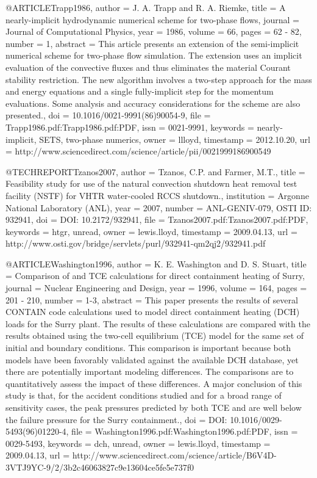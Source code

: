 {{@ARTICLE{Trapp1986,
  author = {J. A. Trapp and R. A. Riemke},
  title = {A nearly-implicit hydrodynamic numerical scheme for two-phase flows},
  journal = {Journal of Computational Physics},
  year = {1986},
  volume = {66},
  pages = {62 - 82},
  number = {1},
  abstract = {This article presents an extension of the semi-implicit numerical
	scheme for two-phase flow simulation. The extension uses an implicit
	evaluation of the convective fluxes and thus eliminates the material
	Courant stability restriction. The new algorithm involves a two-step
	approach for the mass and energy equations and a single fully-implicit
	step for the momentum evaluations. Some analysis and accuracy considerations
	for the scheme are also presented.},
  doi = {10.1016/0021-9991(86)90054-9},
  file = {Trapp1986.pdf:Trapp1986.pdf:PDF},
  issn = {0021-9991},
  keywords = {nearly-implicit, SETS, two-phase numerics},
  owner = {llloyd},
  timestamp = {2012.10.20},
  url = {http://www.sciencedirect.com/science/article/pii/0021999186900549}
}

@TECHREPORT{Tzanos2007,
  author = {Tzanos, C.P. and Farmer, M.T.},
  title = {Feasibility study for use of the natural convection shutdown heat
	removal test facility (NSTF) for VHTR water-cooled RCCS shutdown.},
  institution = {Argonne National Laboratory (ANL)},
  year = {2007},
  number = {ANL-GENIV-079, OSTI ID: 932941},
  doi = {DOI: 10.2172/932941},
  file = {Tzanos2007.pdf:Tzanos2007.pdf:PDF},
  keywords = {htgr, unread},
  owner = {lewis.lloyd},
  timestamp = {2009.04.13},
  url = {http://www.osti.gov/bridge/servlets/purl/932941-qm2qj2/932941.pdf}
}

@ARTICLE{Washington1996,
  author = {K. E. Washington and D. S. Stuart},
  title = {Comparison of and TCE calculations for direct containment heating
	of Surry},
  journal = {Nuclear Engineering and Design},
  year = {1996},
  volume = {164},
  pages = {201 - 210},
  number = {1-3},
  abstract = {This paper presents the results of several CONTAIN code calculations
	used to model direct containment heating (DCH) loads for the Surry
	plant. The results of these calculations are compared with the results
	obtained using the two-cell equilibrium (TCE) model for the same
	set of initial and boundary conditions. This comparison is important
	because both models have been favorably validated against the available
	DCH database, yet there are potentially important modeling differences.
	The comparisons are to quantitatively assess the impact of these
	differences. A major conclusion of this study is that, for the accident
	conditions studied and for a broad range of sensitivity cases, the
	peak pressures predicted by both TCE and are well below the failure
	pressure for the Surry containment.},
  doi = {DOI: 10.1016/0029-5493(96)01220-4},
  file = {Washington1996.pdf:Washington1996.pdf:PDF},
  issn = {0029-5493},
  keywords = {dch, unread},
  owner = {lewis.lloyd},
  timestamp = {2009.04.13},
  url = {http://www.sciencedirect.com/science/article/B6V4D-3VTJ9YC-9/2/3b2c46063827c9e13604ce5fe5e737f0}
}

}}
